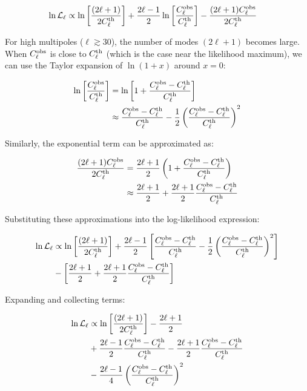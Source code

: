 \documentclass[11pt]{article}
\theoremstyle{definition}
\begin{document}
\begin{align}
\ln\mathcal{L}_\ell &\propto \ln\left[\frac{(2\ell+1)}{2C_\ell^{\rm th}}\right] + \frac{2\ell-1}{2}\ln\left[\frac{C_\ell^{\rm obs}}{C_\ell^{\rm th}}\right] - \frac{(2\ell+1)C_\ell^{\rm obs}}{2C_\ell^{\rm th}}
\end{align}

For high multipoles ($\ell \gtrsim 30$), the number of modes $(2\ell+1)$ becomes large. When $C_\ell^{\rm obs}$ is close to $C_\ell^{\rm th}$ (which is the case near the likelihood maximum), we can use the Taylor expansion of $\ln(1+x)$ around $x=0$:

\begin{align}
\ln\left[\frac{C_\ell^{\rm obs}}{C_\ell^{\rm th}}\right] &= \ln\left[1 + \frac{C_\ell^{\rm obs} - C_\ell^{\rm th}}{C_\ell^{\rm th}}\right] \\
&\approx \frac{C_\ell^{\rm obs} - C_\ell^{\rm th}}{C_\ell^{\rm th}} - \frac{1}{2}\left(\frac{C_\ell^{\rm obs} - C_\ell^{\rm th}}{C_\ell^{\rm th}}\right)^2
\end{align}

Similarly, the exponential term can be approximated as:

\begin{align}
\frac{(2\ell+1)C_\ell^{\rm obs}}{2C_\ell^{\rm th}} &= \frac{2\ell+1}{2}\left(1 + \frac{C_\ell^{\rm obs} - C_\ell^{\rm th}}{C_\ell^{\rm th}}\right) \\
&\approx \frac{2\ell+1}{2} + \frac{2\ell+1}{2}\frac{C_\ell^{\rm obs} - C_\ell^{\rm th}}{C_\ell^{\rm th}}
\end{align}

Substituting these approximations into the log-likelihood expression:

\begin{align}
\ln\mathcal{L}_\ell &\propto \ln\left[\frac{(2\ell+1)}{2C_\ell^{\rm th}}\right] + \frac{2\ell-1}{2}\left[\frac{C_\ell^{\rm obs} - C_\ell^{\rm th}}{C_\ell^{\rm th}} - \frac{1}{2}\left(\frac{C_\ell^{\rm obs} - C_\ell^{\rm th}}{C_\ell^{\rm th}}\right)^2\right] \\
&- \left[\frac{2\ell+1}{2} + \frac{2\ell+1}{2}\frac{C_\ell^{\rm obs} - C_\ell^{\rm th}}{C_\ell^{\rm th}}\right]
\end{align}

Expanding and collecting terms:

\begin{align}
\ln\mathcal{L}_\ell &\propto \ln\left[\frac{(2\ell+1)}{2C_\ell^{\rm th}}\right] - \frac{2\ell+1}{2} \\
&+ \frac{2\ell-1}{2}\frac{C_\ell^{\rm obs} - C_\ell^{\rm th}}{C_\ell^{\rm th}} - \frac{2\ell+1}{2}\frac{C_\ell^{\rm obs} - C_\ell^{\rm th}}{C_\ell^{\rm th}} \\
&- \frac{2\ell-1}{4}\left(\frac{C_\ell^{\rm obs} - C_\ell^{\rm th}}{C_\ell^{\rm th}}\right)^2
\end{align}
\end{document}
